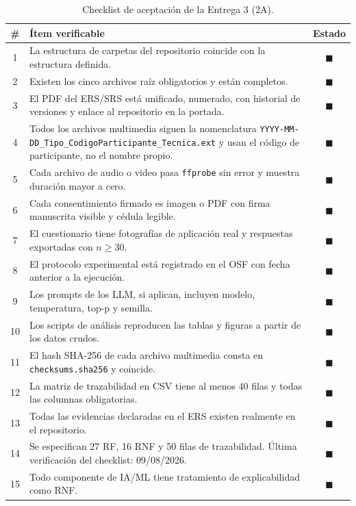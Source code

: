 \documentclass[journal,onecolumn]{IEEEtran}
\begin{document}
	\begin{table}[H]
		\centering
		\caption{Checklist de aceptación de la Entrega 3 (2A).}
		\label{tab:checklist}
		\small
		\begin{tabularx}{\textwidth}{@{}c X c@{}}
			\toprule
			\textbf{\#} & \textbf{Ítem verificable} & \textbf{Estado} \\
			\midrule
			1 & La estructura de carpetas del repositorio coincide con la estructura definida. & $\blacksquare$ \\
			2 & Existen los cinco archivos raíz obligatorios y están completos. & $\blacksquare$ \\
			3 & El PDF del ERS/SRS está unificado, numerado, con historial de versiones y enlace al repositorio en la portada. & $\blacksquare$ \\
			4 & Todos los archivos multimedia siguen la nomenclatura \texttt{YYYY-MM-DD\_Tipo\_CodigoParticipante\_Tecnica.ext} y usan el código de participante, no el nombre propio. & $\blacksquare$ \\
			5 & Cada archivo de audio o video pasa \texttt{ffprobe} sin error y muestra duración mayor a cero. & $\blacksquare$ \\
			6 & Cada consentimiento firmado es imagen o PDF con firma manuscrita visible y cédula legible. & $\blacksquare$ \\
			7 & El cuestionario tiene fotografías de aplicación real y respuestas exportadas con $n \geq 30$. & $\blacksquare$ \\
			8 & El protocolo experimental está registrado en el OSF con fecha anterior a la ejecución. & $\blacksquare$ \\
			9 & Los prompts de los LLM, si aplican, incluyen modelo, temperatura, top-p y semilla. & $\blacksquare$ \\
			10 & Los scripts de análisis reproducen las tablas y figuras a partir de los datos crudos. & $\blacksquare$ \\
			11 & El hash SHA-256 de cada archivo multimedia consta en \texttt{checksums.sha256} y coincide. & $\blacksquare$\\
			12 & La matriz de trazabilidad en CSV tiene al menos 40 filas y todas las columnas obligatorias. &$\blacksquare$ \\
			13 & Todas las evidencias declaradas en el ERS existen realmente en el repositorio. & $\blacksquare$ \\
			14 & Se especifican 27 RF, 16 RNF y 50 filas de trazabilidad. Última verificación del checklist: 09/08/2026. & $\blacksquare$ \\
			15 & Todo componente de IA/ML tiene tratamiento de explicabilidad como RNF. & $\blacksquare$ \\
			\bottomrule
		\end{tabularx}
	\end{table}
	
	
\end{document}
